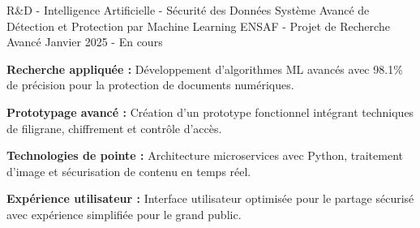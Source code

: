
\begin{cventries}

    \cventry
    {R\&D - Intelligence Artificielle - Sécurité des Données}
    {Système Avancé de Détection et Protection par Machine Learning} %
    {ENSAF - Projet de Recherche Avancé} %
    {Janvier 2025 - En cours} %
    {
        \begin{cvitems} %
            \item {
                        \textbf{Recherche appliquée :}
                        Développement d'algorithmes ML avancés avec 98.1\% de précision pour la protection de documents numériques.}
            \item {
                        \textbf{Prototypage avancé :}
                        Création d'un prototype fonctionnel intégrant techniques de filigrane, chiffrement et contrôle d'accès.}
            \item {
                        \textbf{Technologies de pointe :}
                        Architecture microservices avec Python, traitement d'image et sécurisation de contenu en temps réel.}
            \item {
                        \textbf{Expérience utilisateur :}
                        Interface utilisateur optimisée pour le partage sécurisé avec expérience simplifiée pour le grand public.}
        \end{cvitems}
    }


\end{cventries}
